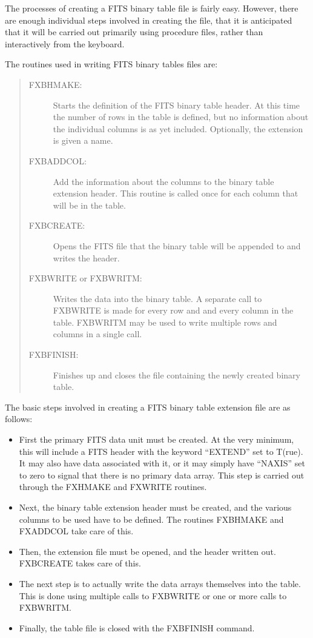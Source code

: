 The processes of creating a FITS binary table file is fairly easy.  However,
there are enough individual steps involved in creating the file, that it is
anticipated that it will be carried out primarily using procedure files, rather
than interactively from the keyboard.

The routines used in writing FITS binary tables files are:
\begin{quote}
\begin{description}
\item[FXBHMAKE:]
Starts the definition of the FITS binary table header.  At this time the number
of rows in the table is defined, but no information about the individual
columns is as yet included.  Optionally, the extension is given a name.
\item[FXBADDCOL:]
Add the information about the columns to the binary table extension header.
This routine is called once for each column that will be in the table.
\item[FXBCREATE:]
Opens the FITS file that the binary table will be appended to and writes the
header.
\item[FXBWRITE or FXBWRITM:]
Writes the data into the binary table.  A separate call to FXBWRITE is
made for every row and and every column in the table.  FXBWRITM may be
used to write multiple rows and columns in a single call.
\item[FXBFINISH:]
Finishes up and closes the file containing the newly created binary table.
\end{description}
\end{quote}

The basic steps involved in creating a FITS binary table extension file are as
follows:
%
\begin{itemize}
\item
	First the primary FITS data unit must be created.  At the very minimum,
	this will include a FITS header with the keyword ``EXTEND'' set to
	T(rue).  It may also have data associated with it, or it may simply
	have ``NAXIS'' set to zero to signal that there is no primary data
	array.  This step is carried out through the FXHMAKE and FXWRITE
	routines.
\item
	Next, the binary table extension header must be created, and the
	various columns to be used have to be defined.  The routines FXBHMAKE
	and FXADDCOL take care of this.
\item
	Then, the extension file must be opened, and the header written out.
	FXBCREATE takes care of this.
\item
	The next step is to actually write the data arrays themselves into the
	table.  This is done using multiple calls to FXBWRITE or one or more
	calls to FXBWRITM.
\item
	Finally, the table file is closed with the FXBFINISH command.
\end{itemize}

